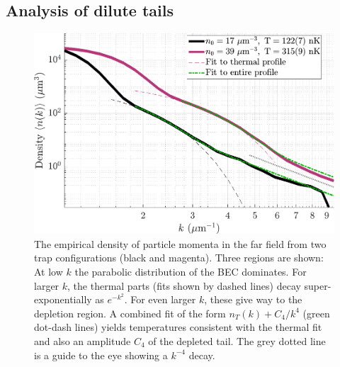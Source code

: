 	


\subsection{Analysis of dilute tails} 
\label{sec:analysis}

  \begin{figure}
       \includegraphics[width=\textwidth]{fig/QD/nk_density.pdf}
	        \caption{The empirical density of particle momenta in the far field from two trap configurations (black and magenta). Three regions are shown: At low $k$ the parabolic distribution of the BEC dominates. For larger $k$, the thermal parts (fits shown by dashed lines) decay super-exponentially as $e^{-k^2}$. For even larger $k$, these give way to the depletion region. A combined fit of the form $n_T(k) + C_4/k^4$ (green dot-dash lines) yields temperatures consistent with the thermal fit and also an amplitude $C_4$ of the depleted tail. The grey dotted line is a guide to the eye showing a $k^{-4}$ decay.}
	        \label{fig:empirical_density}
        \end{figure}	


